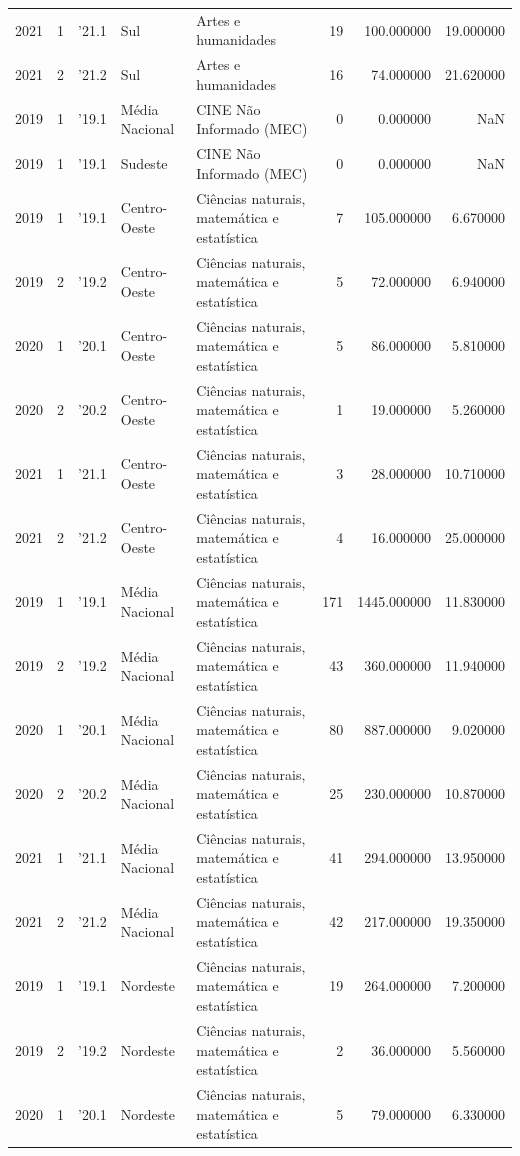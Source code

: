 \begin{longtable}{rrlllrrr}
2021 & 1 & '21.1 & Sul & Artes e humanidades & 19 & 100.000000 & 19.000000 \\
2021 & 2 & '21.2 & Sul & Artes e humanidades & 16 & 74.000000 & 21.620000 \\
2019 & 1 & '19.1 & Média Nacional & CINE Não Informado (MEC) & 0 & 0.000000 & NaN \\
2019 & 1 & '19.1 & Sudeste & CINE Não Informado (MEC) & 0 & 0.000000 & NaN \\
2019 & 1 & '19.1 & Centro-Oeste & Ciências naturais, matemática e estatística & 7 & 105.000000 & 6.670000 \\
2019 & 2 & '19.2 & Centro-Oeste & Ciências naturais, matemática e estatística & 5 & 72.000000 & 6.940000 \\
2020 & 1 & '20.1 & Centro-Oeste & Ciências naturais, matemática e estatística & 5 & 86.000000 & 5.810000 \\
2020 & 2 & '20.2 & Centro-Oeste & Ciências naturais, matemática e estatística & 1 & 19.000000 & 5.260000 \\
2021 & 1 & '21.1 & Centro-Oeste & Ciências naturais, matemática e estatística & 3 & 28.000000 & 10.710000 \\
2021 & 2 & '21.2 & Centro-Oeste & Ciências naturais, matemática e estatística & 4 & 16.000000 & 25.000000 \\
2019 & 1 & '19.1 & Média Nacional & Ciências naturais, matemática e estatística & 171 & 1445.000000 & 11.830000 \\
2019 & 2 & '19.2 & Média Nacional & Ciências naturais, matemática e estatística & 43 & 360.000000 & 11.940000 \\
2020 & 1 & '20.1 & Média Nacional & Ciências naturais, matemática e estatística & 80 & 887.000000 & 9.020000 \\
2020 & 2 & '20.2 & Média Nacional & Ciências naturais, matemática e estatística & 25 & 230.000000 & 10.870000 \\
2021 & 1 & '21.1 & Média Nacional & Ciências naturais, matemática e estatística & 41 & 294.000000 & 13.950000 \\
2021 & 2 & '21.2 & Média Nacional & Ciências naturais, matemática e estatística & 42 & 217.000000 & 19.350000 \\
2019 & 1 & '19.1 & Nordeste & Ciências naturais, matemática e estatística & 19 & 264.000000 & 7.200000 \\
2019 & 2 & '19.2 & Nordeste & Ciências naturais, matemática e estatística & 2 & 36.000000 & 5.560000 \\
2020 & 1 & '20.1 & Nordeste & Ciências naturais, matemática e estatística & 5 & 79.000000 & 6.330000 \\

\end{longtable}
